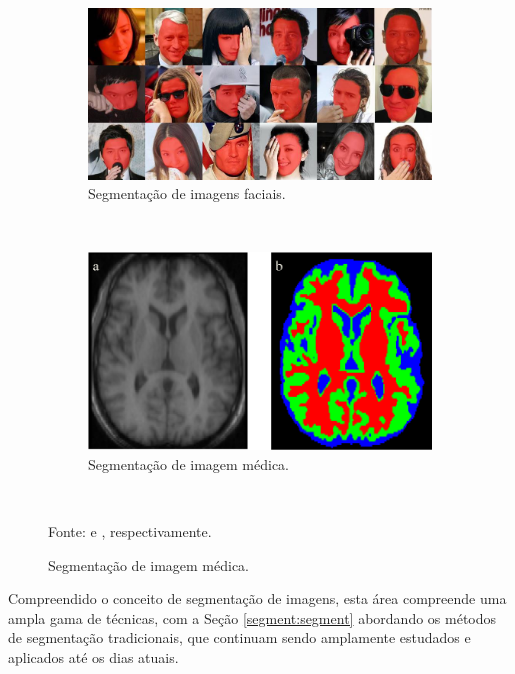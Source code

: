 \begin{figure}[H]
   \caption{Exemplos de segmentações de imagens.}
   \centering
   \label{segment:fig:1}
    \begin{subfigure}[t]{0.6\textwidth}
        \centering
        \includegraphics[width=1\linewidth]{recursos/imagens/image_seg/faces.png}
        \caption{Segmentação de imagens faciais.}
        \label{segment:fig:1.1}
    \end{subfigure}%
    ~ 

    \begin{subfigure}[t]{0.6\textwidth}
        \centering
        \includegraphics[width=1\linewidth]{recursos/imagens/image_seg/cerebro.png}
        \caption{Segmentação de imagem médica.}
        \label{segment:fig:1.2}
    \end{subfigure}%
    ~

    Fonte: \cite{Nirkin2018} e \cite{Withey2008}, respectivamente.
\end{figure}

Compreendido o conceito de segmentação de imagens, esta área compreende uma ampla gama de técnicas, com a Seção \ref{segment:segment} abordando os métodos de segmentação tradicionais, que continuam sendo amplamente estudados e aplicados até os dias atuais.

